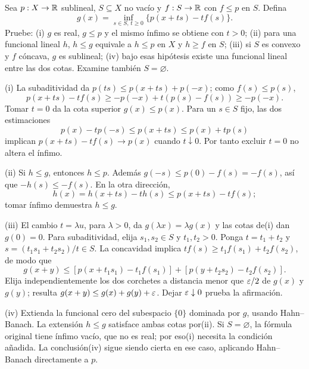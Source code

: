 \begin{ejercicio}\label{ej:v3-l05-4}
Sea $p:X\to\mathbb R$ sublineal, $S\subseteq X$ no vacío y $f:S\to\mathbb R$ con $f\leq p$ en $S$. Defina
\[
 g(x)=\inf_{s\in S,\,t\geq0}\{p(x+ts)-tf(s)\}.
\]
Pruebe: (i) $g$ es real, $g\leq p$ y el mismo ínfimo se obtiene con $t>0$; (ii) para una funcional lineal $h$, $h\leq g$ equivale a $h\leq p$ en $X$ y $h\geq f$ en $S$; (iii) si $S$ es convexo y $f$ cóncava, $g$ es sublineal; (iv) bajo esas hipótesis existe una funcional lineal entre las dos cotas. Examine también $S=\varnothing$.
\end{ejercicio}
\begin{solucion}
(i) La subaditividad da $p(ts)\leq p(x+ts)+p(-x)$; como $f(s)\leq p(s)$,
\[
 p(x+ts)-tf(s)\geq-p(-x)+t(p(s)-f(s))\geq-p(-x).
\]
Tomar $t=0$ da la cota superior $g(x)\leq p(x)$. Para un $s\in S$ fijo, las dos estimaciones
\[
 p(x)-tp(-s)\leq p(x+ts)\leq p(x)+tp(s)
\]
implican $p(x+ts)-tf(s)\to p(x)$ cuando $t\downarrow0$. Por tanto excluir $t=0$ no altera el ínfimo.

(ii) Si $h\leq g$, entonces $h\leq p$. Además $g(-s)\leq p(0)-f(s)=-f(s)$, así que $-h(s)\leq-f(s)$. En la otra dirección,
\[
 h(x)=h(x+ts)-th(s)\leq p(x+ts)-tf(s);
\]
tomar ínfimo demuestra $h\leq g$.

(iii) El cambio $t=\lambda u$, para $\lambda>0$, da $g(\lambda x)=\lambda g(x)$ y las cotas de(i) dan $g(0)=0$. Para subaditividad, elija $s_1,s_2\in S$ y $t_1,t_2>0$. Ponga $t=t_1+t_2$ y $s=(t_1s_1+t_2s_2)/t\in S$. La concavidad implica $tf(s)\geq t_1f(s_1)+t_2f(s_2)$, de modo que
\[
 g(x+y)\leq[p(x+t_1s_1)-t_1f(s_1)]+[p(y+t_2s_2)-t_2f(s_2)].
\]
Elija independientemente los dos corchetes a distancia menor que $\varepsilon/2$ de $g(x)$ y $g(y)$; resulta $g(x+y)\leq g(x)+g(y)+\varepsilon$. Dejar $\varepsilon\downarrow0$ prueba la afirmación.

(iv) Extienda la funcional cero del subespacio $\{0\}$ dominada por $g$, usando Hahn--Banach. La extensión $h\leq g$ satisface ambas cotas por(ii). Si $S=\varnothing$, la fórmula original tiene ínfimo vacío, que no es real; por eso(i) necesita la condición añadida. La conclusión(iv) sigue siendo cierta en ese caso, aplicando Hahn--Banach directamente a $p$.
\end{solucion}

